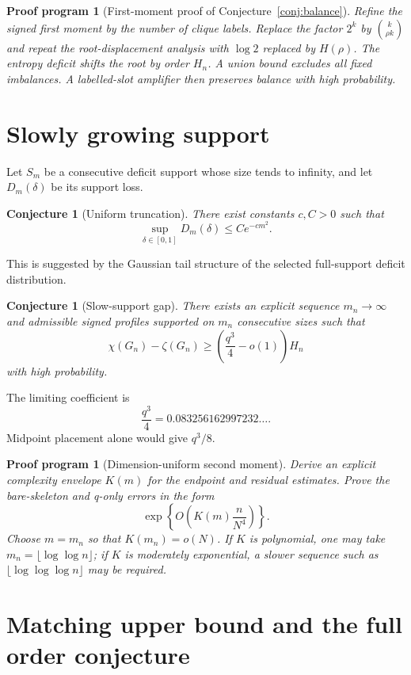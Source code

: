 \documentclass[11pt]{article}
\newtheorem{conjecture}[theorem]{Conjecture}
\newtheorem{program}[theorem]{Proof program}
\theoremstyle{definition}
\begin{document}
\begin{program}[First-moment proof of Conjecture~\ref{conj:balance}]
Refine the signed first moment by the number of clique labels.  Replace the
factor $2^k$ by $\binom{k}{\rho k}$ and repeat the root-displacement analysis
with $\log2$ replaced by $H(\rho)$.  The entropy deficit shifts the root by
order $H_n$.  A union bound excludes all fixed imbalances.  A labelled-slot
amplifier then preserves balance with high probability.
\end{program}

\section{Slowly growing support}

Let $S_m$ be a consecutive deficit support whose size tends to infinity, and
let $D_m(\delta)$ be its support loss.

\begin{conjecture}[Uniform truncation]
There exist constants $c,C>0$ such that
\[
 \sup_{\delta\in[0,1]}D_m(\delta)\le Ce^{-cm^2}.
\]
\end{conjecture}

This is suggested by the Gaussian tail structure of the selected full-support
deficit distribution.

\begin{conjecture}[Slow-support gap]
\label{conj:slow-support}
There exists an explicit sequence $m_n\to\infty$ and admissible signed profiles
supported on $m_n$ consecutive sizes such that
\[
 \chi(G_n)-\zeta(G_n)
 \ge
 \left(\frac{q^3}{4}-o(1)\right)H_n
\]
with high probability.
\end{conjecture}

The limiting coefficient is
\[
 \frac{q^3}{4}=0.083256162997232\ldots.
\]
Midpoint placement alone would give $q^3/8$.

\begin{program}[Dimension-uniform second moment]
Derive an explicit complexity envelope $K(m)$ for the endpoint and residual
estimates.  Prove the bare-skeleton and q-only errors in the form
\[
 \exp\left\{O\left(K(m)\frac n{N^4}\right)\right\}.
\]
Choose $m=m_n$ so that $K(m_n)=o(N)$.  If $K$ is polynomial, one may take
$m_n=\lfloor\log\log n\rfloor$; if $K$ is moderately exponential, a slower
sequence such as $\lfloor\log\log\log n\rfloor$ may be required.
\end{program}

\section{Matching upper bound and the full order conjecture}
\end{document}
